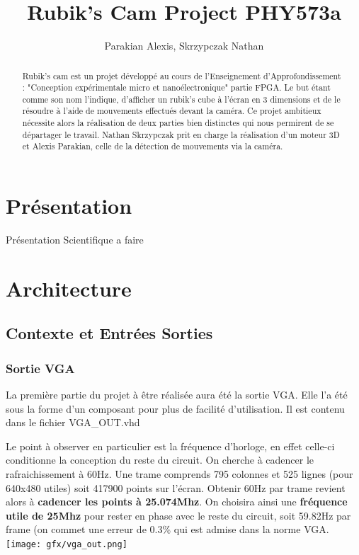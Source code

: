 \documentclass[10pt,a4paper]{report}
\author{Parakian Alexis, Skrzypczak Nathan}
\title{Rubik's Cam Project PHY573a}
\begin{document}
\maketitle
\begin{abstract}
Rubik's cam est un projet développé au cours de l'Enseignement d'Approfondissement : "Conception expérimentale micro et nanoélectronique" partie FPGA. Le but étant comme son nom l'indique, d'afficher un rubik's cube à l'écran en 3 dimensions et de le résoudre à l'aide de mouvements effectués devant la caméra. Ce projet ambitieux nécessite alors la réalisation de deux parties bien distinctes qui nous permirent de se départager le travail. Nathan Skrzypczak prit en charge la réalisation d'un moteur 3D et Alexis Parakian, celle de la détection de mouvements via la caméra.
\end{abstract}

\tableofcontents
\newpage

\chapter{Présentation}

Présentation Scientifique a faire

\chapter{Architecture}

\section{Contexte et Entrées Sorties}

\subsection{Sortie VGA}

La première partie du projet à être réalisée aura été la sortie VGA. Elle l'a été sous la forme d'un composant pour plus de facilité d'utilisation. Il est contenu dans le fichier VGA\_OUT.vhd

Le point à observer en particulier est la fréquence d'horloge, en effet celle-ci conditionne la conception du reste du circuit.  On cherche à cadencer le rafraichissement à 60Hz. Une trame comprends 795 colonnes et 525 lignes (pour 640x480 utiles) soit 417900 points sur l'écran. Obtenir 60Hz par trame revient alors à \textbf{cadencer les points à 25.074Mhz}. On choisira ainsi une \textbf{fréquence utile de 25Mhz} pour rester en phase avec le reste du circuit, soit 59.82Hz par frame (on commet une erreur de 0.3\% qui est admise dans la norme VGA.
\texttt{[image: gfx/vga\_out.png]}
\end{document}
